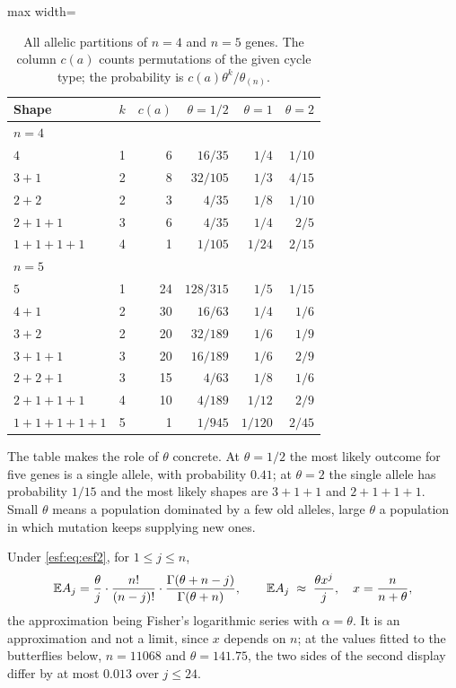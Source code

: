 \begin{table}[htbp]
\centering
\caption{All allelic partitions of $n = 4$ and $n = 5$ genes. The column $c(a)$ counts
permutations of the given cycle type; the probability is $c(a)\theta^{k}/\theta_{(n)}$.}
\label{esf:tab:small}
\begin{adjustbox}{max width=\textwidth}
\begin{tabular}{lrrrrr}
\toprule
Shape & $k$ & $c(a)$ & $\theta = 1/2$ & $\theta = 1$ & $\theta = 2$ \\
\midrule
\multicolumn{6}{l}{$n = 4$} \\
$4$         & 1 & 6  & $16/35$  & $1/4$  & $1/10$ \\
$3+1$       & 2 & 8  & $32/105$ & $1/3$  & $4/15$ \\
$2+2$       & 2 & 3  & $4/35$   & $1/8$  & $1/10$ \\
$2+1+1$     & 3 & 6  & $4/35$   & $1/4$  & $2/5$ \\
$1+1+1+1$   & 4 & 1  & $1/105$  & $1/24$ & $2/15$ \\
\midrule
\multicolumn{6}{l}{$n = 5$} \\
$5$         & 1 & 24 & $128/315$ & $1/5$   & $1/15$ \\
$4+1$       & 2 & 30 & $16/63$   & $1/4$   & $1/6$ \\
$3+2$       & 2 & 20 & $32/189$  & $1/6$   & $1/9$ \\
$3+1+1$     & 3 & 20 & $16/189$  & $1/6$   & $2/9$ \\
$2+2+1$     & 3 & 15 & $4/63$    & $1/8$   & $1/6$ \\
$2+1+1+1$   & 4 & 10 & $4/189$   & $1/12$  & $2/9$ \\
$1+1+1+1+1$ & 5 & 1  & $1/945$   & $1/120$ & $2/45$ \\
\bottomrule
\end{tabular}
\end{adjustbox}
\end{table}

The table makes the role of $\theta$ concrete. At $\theta = 1/2$ the most likely
outcome for five genes is a single allele, with probability $0.41$; at $\theta = 2$ the
single allele has probability $1/15$ and the most likely shapes are $3+1+1$ and
$2+1+1+1$. Small $\theta$ means a population dominated by a few old alleles, large
$\theta$ a population in which mutation keeps supplying new ones.

\begin{proposition}
\label{esf:prop:moments}
Under \eqref{esf:eq:esf2}, for $1 \le j \le n$,
\begin{equation}
\mathbb{E} A_j = \frac{\theta}{j} \cdot \frac{n!}{(n-j)!} \cdot
\frac{\Gamma(\theta + n - j)}{\Gamma(\theta + n)},
\qquad
\mathbb{E} A_j \; \approx \; \frac{\theta x^{j}}{j}, \quad x = \frac{n}{n+\theta},
\label{esf:eq:EAj}
\end{equation}
the approximation being Fisher's logarithmic series with $\alpha = \theta$. It is an
approximation and not a limit, since $x$ depends on $n$; at the values fitted to the
butterflies below, $n = 11068$ and $\theta = 141.75$, the two sides of the second display
differ by at most $0.013$ over $j \le 24$.
\end{proposition}

